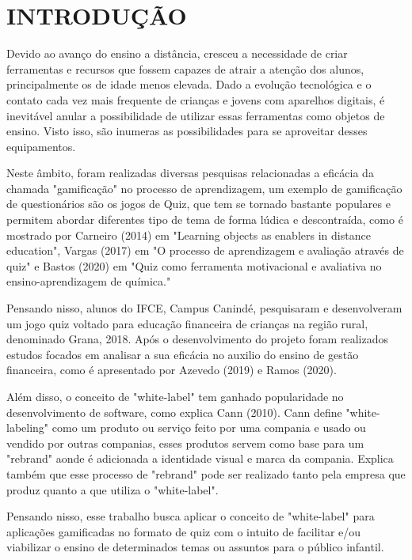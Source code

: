 \chapter{INTRODUÇÃO}
\thispagestyle{empty}

Devido ao avanço do ensino a distância, cresceu a necessidade de criar ferramentas e recursos que fossem capazes de atrair a atenção dos alunos, principalmente os de idade menos elevada. Dado a evolução tecnológica e o contato cada vez mais frequente de crianças e jovens com aparelhos digitais, é inevitável anular a possibilidade de utilizar essas ferramentas como objetos de ensino. Visto isso, são inumeras as possibilidades para se aproveitar desses equipamentos.

Neste âmbito, foram realizadas diversas pesquisas relacionadas a eficácia da chamada "gamificação" no processo de aprendizagem, um exemplo de gamificação de questionários são os jogos de Quiz, que tem se tornado bastante populares e permitem abordar diferentes tipo de tema de forma lúdica e descontraída, como é mostrado por Carneiro (2014) em "Learning objects as enablers in distance education"\nocite{carneiro2014learning}, Vargas (2017) em "O processo de aprendizagem e avaliação através de
quiz"\nocite{vargas2017processo} e Bastos (2020) em "Quiz como ferramenta motivacional e avaliativa no ensino-aprendizagem de química."\nocite{bastos2020quiz}

Pensando nisso, alunos do IFCE, Campus Canindé, pesquisaram e desenvolveram um jogo quiz voltado para educação financeira de crianças na região rural, denominado Grana, 2018\nocite{pereira2018grana}. Após o desenvolvimento do projeto foram realizados estudos focados em analisar a sua eficácia no auxilio do ensino de gestão financeira, como é apresentado por Azevedo (2019)\nocite{azevedo2019analise} e Ramos (2020)\nocite{ramos2020analise}.

Além disso, o conceito de "white-label" tem ganhado popularidade no desenvolvimento de software, como explica Cann (2010). Cann define "white-labeling" como um produto ou serviço feito por uma compania e usado ou vendido por outras companias, esses produtos servem como base para um "rebrand" aonde é adicionada a identidade visual e marca da compania. Explica também que esse processo de "rebrand" pode ser realizado tanto pela empresa que produz quanto a que utiliza o "white-label".

Pensando nisso, esse trabalho busca aplicar o conceito de "white-label" para aplicações gamificadas no formato de quiz com o intuito de facilitar e/ou viabilizar o ensino de determinados temas ou assuntos para o público infantil.